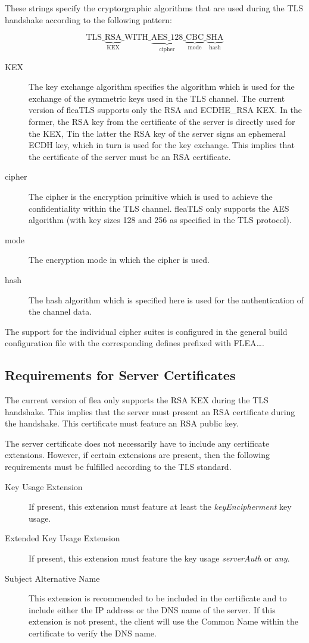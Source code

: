 \documentclass[a4paper,11pt]{scrartcl}
\begin{document}
These strings specify the cryptorgraphic algorithms that are used during the TLS
handshake according to the following pattern:

$$
\mathrm{TLS\_}\underbrace{\mathrm{RSA}}_{\mathrm{KEX}}\mathrm{\_WITH\_}\underbrace{\mathrm{AES\_128}}_{\mathrm{cipher}}\_\underbrace{\mathrm{CBC}}_{\mathrm{mode}
}\_\underbrace{\mathrm{SHA}}_{\mathrm{hash} }
$$
\begin{description}
  \item[KEX] The key exchange algorithm specifies the algorithm which is used
    for the exchange of the symmetric keys used in the TLS channel. The current
    version of fleaTLS supports only the RSA and ECDHE\_RSA KEX. In the former,
    the RSA key from the certificate of the server is directly used for the KEX,
    Tin the latter the RSA key of the server signs an ephemeral ECDH key, which
    in turn is used for the key exchange. This implies that the
    certificate of the server must be an RSA certificate.
  \item[cipher] The cipher is the encryption primitive which is used to achieve
    the confidentiality within the TLS channel. fleaTLS only supports the AES
    algorithm (with key sizes 128 and 256 as specified in the TLS protocol).
  \item [mode] The encryption mode in which the cipher is used. 
  \item[hash] The hash algorithm which is specified here is used for the
    authentication of the channel data.
  \end{description}
The support for the individual cipher suites is configured in the general build
configuration file with the corresponding defines prefixed with FLEA\ldots .


\subsection{Requirements for Server Certificates}

The current version of flea only supports the RSA KEX during the TLS handshake.
This implies that the server must present an RSA certificate during the
handshake. This certificate must feature an RSA public key.

The server certificate does not necessarily have to include any certificate
extensions. However, if certain extensions are present, then the following
requirements must be fulfilled according to the TLS standard.
\begin{description}
  \item [Key Usage Extension] If present, this extension must feature at least
    the \emph{keyEncipherment} key usage.
  \item [Extended Key Usage Extension] If present, this extension must feature
    the key usage \emph{serverAuth} or \emph{any}.
  \item [Subject Alternative Name] This extension is recommended to be included
    in the certificate and to include either the IP address or the DNS name of
    the server. If this extension is not present, the client will use the Common
Name within the certificate to verify the DNS name.
\end{description}
\end{document}
